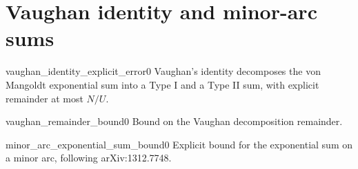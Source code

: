 \chapter{Vaughan identity and minor-arc sums}

\begin{theorem}{vaughan_identity_explicit_error}{0}
Vaughan's identity decomposes the von Mangoldt exponential sum into a Type I and a Type II
sum, with explicit remainder at most $N/U$.
\end{theorem}

\begin{lemma}{vaughan_remainder_bound}{0}
Bound on the Vaughan decomposition remainder.
\end{lemma}

\begin{theorem}{minor_arc_exponential_sum_bound}{0}
Explicit bound for the exponential sum on a minor arc, following arXiv:1312.7748.
\end{theorem}

